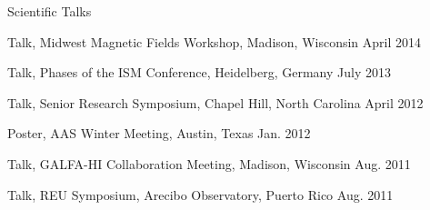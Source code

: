 \documentclass{resume_clark} %
\begin{document}
\begin{rSection}{Scientific Talks}
\begin{etaremune}
\item Talk, Midwest Magnetic Fields Workshop, Madison, Wisconsin \hfill {April 2014}

\item Talk, Phases of the ISM Conference, Heidelberg, Germany \hfill {July 2013}

\item Talk, Senior Research Symposium, Chapel Hill, North Carolina \hfill {April 2012}

\item Poster, AAS Winter Meeting, Austin, Texas \hfill {Jan. 2012}

\item Talk, GALFA-HI Collaboration Meeting, Madison, Wisconsin \hfill {Aug. 2011}

\item Talk, REU Symposium, Arecibo Observatory, Puerto Rico \hfill {Aug. 2011}

\end{etaremune}



\end{rSection}
\end{document}
